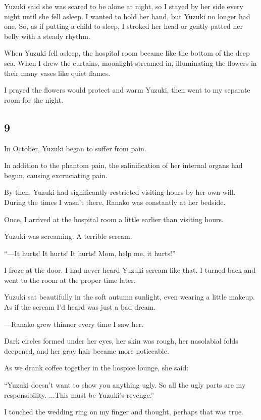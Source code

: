 \documentclass[
    a4paper,
    12pt,
    twoside,
    openany,
    UTF8,
    fontset=windows
]{ctexbook}
\begin{document}
Yuzuki said she was scared to be alone at night, so I stayed by her side every night until she fell asleep. I wanted to hold her hand, but Yuzuki no longer had one. So, as if putting a child to sleep, I stroked her head or gently patted her belly with a steady rhythm.

When Yuzuki fell asleep, the hospital room became like the bottom of the deep sea. When I drew the curtains, moonlight streamed in, illuminating the flowers in their many vases like quiet flames.

I prayed the flowers would protect and warm Yuzuki, then went to my separate room for the night.


\subsection*{9}

In October, Yuzuki began to suffer from pain.

In addition to the phantom pain, the salinification of her internal organs had begun, causing excruciating pain.

By then, Yuzuki had significantly restricted visiting hours by her own will. During the times I wasn't there, Ranako was constantly at her bedside.

Once, I arrived at the hospital room a little earlier than visiting hours.

Yuzuki was screaming. A terrible scream.

``---It hurts! It hurts! It hurts! Mom, help me, it hurts!''

I froze at the door. I had never heard Yuzuki scream like that. I turned back and went to the room at the proper time later.

Yuzuki sat beautifully in the soft autumn sunlight, even wearing a little makeup. As if the scream I'd heard was just a bad dream.

---Ranako grew thinner every time I saw her.

Dark circles formed under her eyes, her skin was rough, her nasolabial folds deepened, and her gray hair became more noticeable.

As we drank coffee together in the hospice lounge, she said:

``Yuzuki doesn't want to show you anything ugly. So all the ugly parts are my responsibility. ...This must be Yuzuki's revenge.''

I touched the wedding ring on my finger and thought, perhaps that was true.
\end{document}

